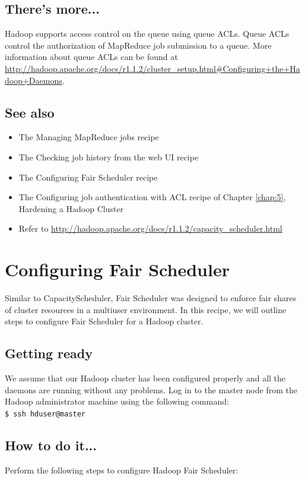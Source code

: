 \subsection*{There's more...}
Hadoop supports access control on the queue using queue ACLs. Queue ACLs control the authorization of MapReduce job submission to a queue. More information about queue ACLs can be found at \url{http://hadoop.apache.org/docs/r1.1.2/cluster_setup.html#Configuring+the+Hadoop+Daemons}.

\subsection*{See also}
\begin{itemize}
  \item The Managing MapReduce jobs recipe
  \item The Checking job history from the web UI recipe
  \item The Configuring Fair Scheduler recipe
  \item The Configuring job authentication with ACL recipe of Chapter \ref{chap:5}, Hardening a Hadoop Cluster
  \item Refer to \url{http://hadoop.apache.org/docs/r1.1.2/capacity_scheduler.html}
\end{itemize}

\section{Configuring Fair Scheduler}
Similar to CapacityScheduler, Fair Scheduler was designed to enforce fair shares of cluster resources in a multiuser environment. In this recipe, we will outline steps to configure Fair Scheduler for a Hadoop cluster.

\subsection*{Getting ready}
We assume that our Hadoop cluster has been configured properly and all the daemons are running without any problems.
Log in to the master node from the Hadoop administrator machine using the following command: \\
\verb|$ ssh hduser@master|

\subsection*{How to do it...}
Perform the following steps to configure Hadoop Fair Scheduler: 

